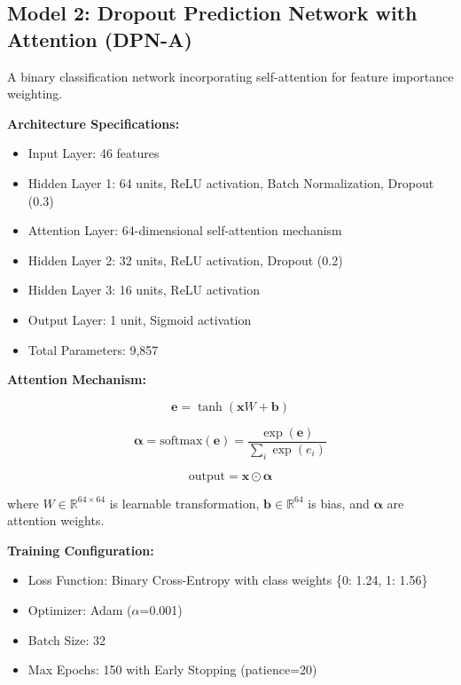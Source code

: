 \subsection{Model 2: Dropout Prediction Network with Attention (DPN-A)}

A binary classification network incorporating self-attention for feature importance weighting.

\textbf{Architecture Specifications:}
\begin{itemize}
\item Input Layer: 46 features
\item Hidden Layer 1: 64 units, ReLU activation, Batch Normalization, Dropout (0.3)
\item Attention Layer: 64-dimensional self-attention mechanism
\item Hidden Layer 2: 32 units, ReLU activation, Dropout (0.2)
\item Hidden Layer 3: 16 units, ReLU activation
\item Output Layer: 1 unit, Sigmoid activation
\item Total Parameters: 9,857
\end{itemize}

\textbf{Attention Mechanism:}

\begin{equation}
\mathbf{e} = \tanh(\mathbf{x} W + \mathbf{b})
\end{equation}

\begin{equation}
\boldsymbol{\alpha} = \text{softmax}(\mathbf{e}) = \frac{\exp(\mathbf{e})}{\sum_i \exp(e_i)}
\end{equation}

\begin{equation}
\text{output} = \mathbf{x} \odot \boldsymbol{\alpha}
\end{equation}

where $W \in \mathbb{R}^{64 \times 64}$ is learnable transformation, $\mathbf{b} \in \mathbb{R}^{64}$ is bias, and $\boldsymbol{\alpha}$ are attention weights.

\textbf{Training Configuration:}
\begin{itemize}
\item Loss Function: Binary Cross-Entropy with class weights \{0: 1.24, 1: 1.56\}
\item Optimizer: Adam ($\alpha$=0.001)
\item Batch Size: 32
\item Max Epochs: 150 with Early Stopping (patience=20)
\end{itemize}

